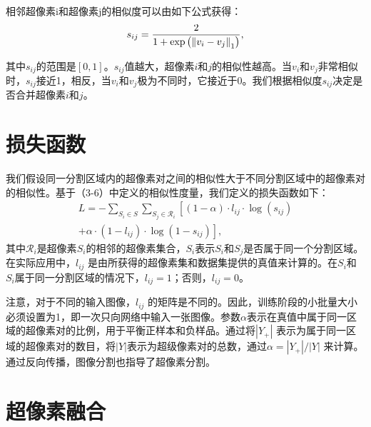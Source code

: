 相邻超像素i和超像素j的相似度可以由如下公式获得：
\begin{equation}\label{eqn:sim}
s_{ij} = \frac{2}{1+{\rm exp}\left ( \left \| v_{i}-v_{j}\right \|_{1}\right )},
\end{equation}

其中$s_{ij}$的范围是$[0,1]$。$s_{ij}$值越大，超像素$i$和$j$的相似性越高。当$v_{i}$和$v_{j}$非常相似时，$s_{ij}$接近1，相反，当$v_{i}$和$v_{j}$极为不同时，它接近于0。我们根据相似度$s_{ij}$决定是否合并超像素$i$和$j$。

\section{损失函数}

我们假设同一分割区域内的超像素对之间的相似性大于不同分割区域中的超像素对的相似性。基于（3-6）中定义的相似性度量，我们定义的损失函数如下：
\begin{equation}
\begin{split}
 L =  - \sum_{S_{i}\in S}\sum_{S_{j}\in \mathcal{R}_{i}}   \left[   { \left(
 1  -\alpha  \right)\cdot l_{ij}\cdot \log \left( s_{ij} \right)  } \right. \\
 \left. {  + \alpha \cdot \left( 1-l_{ij}\right) \cdot \log \left( 1- s_{ij}\right)  }   \right],
 \label{equation.6}
\end{split}
\end{equation}
其中$\mathcal{R}_{i}$是超像素$S_{i}$的相邻的超像素集合，$S_i$表示$S_i$和$S_j$是否属于同一个分割区域。在实际应用中，$l_{ij}$ 是由所获得的超像素集和数据集提供的真值来计算的。在$S_i$和$S_i$属于同一分割区域的情况下，$l_{ij} = 1$；否则，$l_{ij} = 0$。

注意，对于不同的输入图像，$l_{ij}$ 的矩阵是不同的。因此，训练阶段的小批量大小必须设置为1，即一次只向网络中输入一张图像。参数$\alpha$表示在真值中属于同一区域的超像素对的比例，用于平衡正样本和负样品。通过将$|Y_+|$ 表示为属于同一区域的超像素对的数目，将$|Y|$表示为超级像素对的总数，通过$\alpha  = \left | Y_{+}\right | / \left | Y \right |$ 来计算。通过反向传播，图像分割也指导了超像素分割。

\section{超像素融合}

